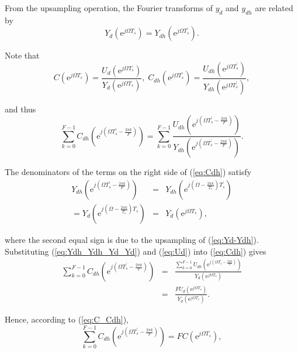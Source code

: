\documentclass [11pt, proquest] {uwthesis}[2020/02/24]
\begin{document}
From the upsampling operation, the Fourier transforms of $y_{d}$
and $y_{dh}$ are related by
\begin{equation}
Y_{d}(\text{e}^{j\Omega T_{s}})=Y_{dh}(\text{e}^{j\Omega T_{s}^{'}}).\label{eq:Yd-Ydh}
\end{equation}

Note that
\begin{equation}
C(\text{e}^{j\Omega T_{s}})=\frac{U_{d}(\text{e}^{j\Omega T_{s}})}{Y_{d}(\text{e}^{j\Omega T_{s}})},\;C_{dh}(\text{e}^{j\Omega T_{s}^{'}})=\frac{U_{dh}(\text{e}^{j\Omega T_{s}^{'}})}{Y_{dh}(\text{e}^{j\Omega T_{s}^{'}})},\label{eq:C_Cdh}
\end{equation}

\noindent and thus
\begin{equation}
\sum_{k=0}^{F-1}C_{dh}(\text{e}^{j(\Omega T_{s}^{'}-\frac{2\pi k}{F})})=\sum_{k=0}^{F-1}\frac{U_{dh}(\text{e}^{j(\Omega T_{s}^{'}-\frac{2\pi k}{F})})}{Y_{dh}(\text{e}^{j(\Omega T_{s}^{'}-\frac{2\pi k}{F})})}.\label{eq:Cdh}
\end{equation}

The denominators of the terms on the right side of (\ref{eq:Cdh})
satisfy
\begin{eqnarray}
Y_{dh}(\text{e}^{j(\Omega T_{s}^{'}-\frac{2\pi k}{F})}) & = & Y_{dh}(\text{e}^{j(\Omega-\frac{2\pi k}{T_{s}})T_{s}^{'}})\nonumber \\
=Y_{d}(\text{e}^{j(\Omega-\frac{2\pi k}{T_{s}})T_{s}}) & = & Y_{d}(\text{e}^{j\Omega T_{s}}),\label{eq:Ydh_Ydh_Yd_Yd}
\end{eqnarray}

\noindent where the second equal sign is due to the upsampling of
(\ref{eq:Yd-Ydh}). Substituting (\ref{eq:Ydh_Ydh_Yd_Yd}) and (\ref{eq:Ud})
into (\ref{eq:Cdh}) gives
\begin{eqnarray}
\sum_{k=0}^{F-1}C_{dh}(\text{e}^{j(\Omega T_{s}^{'}-\frac{2\pi k}{F})}) & = & \frac{\sum_{k=0}^{F-1}U_{dh}(\text{e}^{j(\Omega T_{s}^{'}-\frac{2\pi k}{F})})}{Y_{d}(\text{e}^{j\Omega T_{s}})}\nonumber \\
 & = & \frac{FU_{d}(\text{e}^{j\Omega T_{s}})}{Y_{d}(\text{e}^{j\Omega T_{s}})}.\label{eq:Cdh-sum}
\end{eqnarray}

\noindent Hence, according to (\ref{eq:C_Cdh}),
\begin{equation}
\sum_{k=0}^{F-1}C_{dh}(\text{e}^{j(\Omega T_{s}^{'}-\frac{2\pi k}{F})})=FC(\text{e}^{j\Omega T_{s}}),\label{eq:Cdh-sum-C}
\end{equation}
\end{document}

